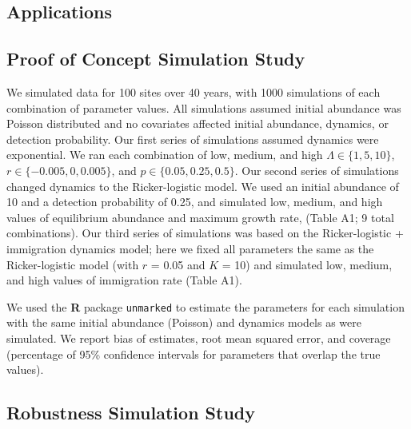 \documentclass[12pt,english]{article}
\begin{document}
\begin{spacing}{1.9}
\begin{flushleft}
\section*{Applications}
\label{sec:app}

\subsection*{Proof of Concept Simulation Study}


We simulated data for 100 sites over 40 years, with 1000 simulations of 
each combination of parameter values.  All
simulations assumed initial abundance was Poisson distributed
and no covariates affected initial abundance, dynamics, or
detection probability.  Our first series of simulations
assumed dynamics were exponential.  We ran 
each combination of low, medium, and high $\Lambda \in
\{1,5,10\}$, $r \in \{-0.005, 0, 0.005\}$, and
$p \in \{0.05, 0.25, 0.5\}$. 
Our second series of simulations changed dynamics to the Ricker-logistic
model. We used an initial abundance of 10 and a detection probability
of 0.25, and simulated low, medium, and high values of equilibrium
abundance and maximum growth rate, (Table A1;
9 total combinations). Our third series of simulations was based
on the Ricker-logistic + immigration dynamics model; here we fixed all
parameters the same as the Ricker-logistic model (with $r$ = 0.05 and $K$ = 10) and
simulated low, medium, and high values of immigration rate (Table A1).

We used the \textbf{R} package \texttt{unmarked} to estimate the parameters 
for each simulation with the same
initial abundance (Poisson) and dynamics models as were simulated.
We report bias of estimates, root
mean squared error, and coverage (percentage of 95\% confidence
intervals for parameters that overlap the true values).

\subsection*{Robustness Simulation Study}


\end{flushleft}
\end{spacing}
\end{document}
